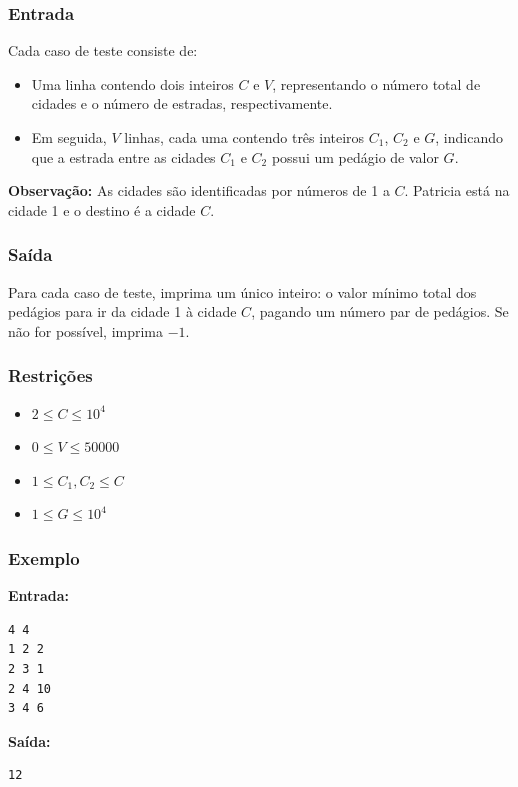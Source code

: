 \subsubsection*{Entrada}
Cada caso de teste consiste de:
\begin{itemize}
    \item Uma linha contendo dois inteiros \( C \) e \( V \), representando o número total de cidades e o número de estradas, respectivamente.
    \item Em seguida, \( V \) linhas, cada uma contendo três inteiros \( C_1 \), \( C_2 \) e \( G \), indicando que a estrada entre as cidades \( C_1 \) e \( C_2 \) possui um pedágio de valor \( G \).
\end{itemize}

\textbf{Observação:} As cidades são identificadas por números de 1 a \( C \). Patricia está na cidade 1 e o destino é a cidade \( C \).

\subsubsection*{Saída}
Para cada caso de teste, imprima um único inteiro: o valor mínimo total dos pedágios para ir da cidade 1 à cidade \( C \), pagando um número par de pedágios. Se não for possível, imprima \(-1\).

\subsubsection*{Restrições}
\begin{itemize}
    \item \(2 \le C \le 10^4\)
    \item \(0 \le V \le 50000\)
    \item \(1 \le C_1, C_2 \le C\)
    \item \(1 \le G \le 10^4\)
\end{itemize}

\subsubsection*{Exemplo}

\textbf{Entrada:}
\begin{verbatim}
4 4
1 2 2
2 3 1
2 4 10
3 4 6
\end{verbatim}

\textbf{Saída:}
\begin{verbatim}
12
\end{verbatim}

